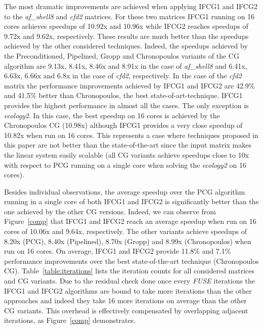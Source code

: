 The most dramatic improvements are achieved when applying IFCG1 and IFCG2 to the \emph{af\_shell8} and \emph{cfd2} matrices. 
For these two matrices IFCG1 running on 16 cores achieves speedups of 10.92x and 10.96x while IFCG2 reaches speedups of 9.72x and 9.62x, respectively.
These results are much better than the speedups achieved by the other considered techniques.
Indeed, the speedups achieved by the Preconditioned, Pipelined, Gropp and Chronopoulos variants of the CG algorithm are 9.13x, 8.41x, 8.46x and 8.91x in the case of \emph{af\_shell8} and 6.41x, 6.63x, 6.66x and 6.8x in the case of \emph{cfd2}, respectively.
In the case of the \emph{cfd2} matrix the performance improvements achieved by IFCG1 and IFCG2 are 42.9\% and 41.5\% better than Chronopoulos, the best state-of-art-technique.
IFCG1 provides the highest performance in almost all the cases.
The only exception is \emph{ecology2}. %
In this case, the best speedup on 16 cores is achieved by the Chronopoulos CG (10.98x) although IFCG1 provides a very close speedup of 10.82x when run on 16 cores.
This represents a case where techniques proposed in this paper are not better than the state-of-the-art since the input matrix makes the linear system easily scalable (all CG variants achieve speedups close to 10x with respect to PCG running on a single core when solving the \emph{ecology2} on 16 cores).


Besides individual observations, the average speedup over the PCG algorithm running in a single core of both IFCG1 and IFCG2 is significantly better than the one achieved by the other CG versions. 
Indeed, we can observe from Figure~\ref{comp} that IFCG1 and IFCG2 reach an average speedup 
when run on 16 cores of 10.06x and 9.64x, respectively.
The other variants achieve speedups of 8.20x (PCG), 8.40x (Pipelined), 8.70x (Gropp) and 8.99x (Chronopoulos) when run on 16 cores.  
On average, IFCG1 and IFCG2 provide 11.8\% and 7.1\% performance improvements over the best state-of-the-art technique (Chronopoulos CG).
Table~\ref{table:iterations} lists the iteration counts for all considered matrices and CG variants.
Due to the residual check done once every \emph{FUSE} iterations the IFCG1 and IFCG2 algorithms are
bound to take more iterations than the other approaches and
indeed they take 16 more iterations on average than the other CG variants. 
This overhead is effectively compensated by overlapping adjacent iterations, as Figure~\ref{comp} demonstrates.

